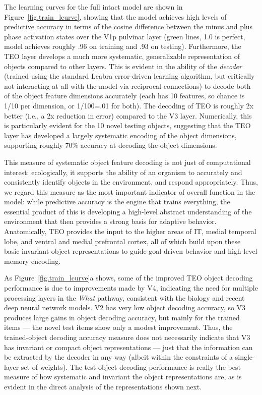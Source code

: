 \documentclass[11pt,twoside]{article}
\newif\myifpdf
\begin{document}
The learning curves for the full intact model are shown in Figure~\ref{fig.train_lcurve}, showing that the model achieves high levels of predictive accuracy in terms of the cosine difference between the minus and plus phase activation states over the V1p pulvinar layer (green lines, 1.0 is perfect, model achieves roughly .96 on training and .93 on testing).  Furthermore, the TEO layer develops a much more systematic, generalizable representation of objects compared to other layers.  This is evident in the ability of the {\em decoder} (trained using the standard Leabra error-driven learning algorithm, but critically not interacting at all with the model via reciprocal connections) to decode both of the object feature dimensions accurately (each has 10 features, so chance is 1/10 per dimension, or 1/100=.01 for both).  The decoding of TEO is roughly 2x better (i.e., a 2x reduction in error) compared to the V3 layer.  Numerically, this is particularly evident for the 10 novel testing objects, suggesting that the TEO layer has developed a largely systematic encoding of the object dimensions, supporting roughly 70\% accuracy at decoding the object dimensions.

This measure of systematic object feature decoding is not just of computational interest: ecologically, it supports the ability of an organism to accurately and consistently identify objects in the environment, and respond appropriately.  Thus, we regard this measure as the most important indicator of overall function in the model: while predictive accuracy is the engine that trains everything, the essential product of this is developing a high-level abstract understanding of the environment that then provides a strong basis for adaptive behavior.  Anatomically, TEO provides the input to the higher areas of IT, medial temporal lobe, and ventral and medial prefrontal cortex, all of which build upon these basic invariant object representations to guide goal-driven behavior and high-level memory encoding.

As Figure~\ref{fig.train_lcurve}a shows, some of the improved TEO object decoding performance is due to improvements made by V4, indicating the need for multiple processing layers in the {\em What} pathway, consistent with the biology and recent deep neural network models.  V2 has very low object decoding accuracy, so V3 produces large gains in object decoding accuracy, but mainly for the trained items --- the novel test items show only a modest improvement.  Thus, the trained-object decoding accuracy measure does not necessarily indicate that V3 has invariant or compact object representations --- just that the information can be extracted by the decoder in any way (albeit within the constraints of a single-layer set of weights).  The test-object decoding performance is really the best measure of how systematic and invariant the object representations are, as is evident in the direct analysis of the representations shown next.
\end{document}
